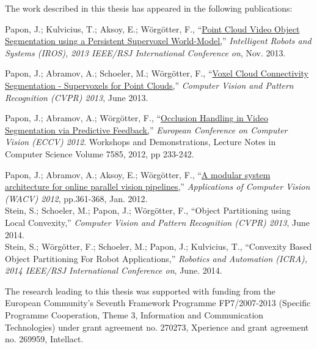 
\noindent


The work described in this thesis has appeared in the following publications: \\
\vspace{24pt} 

\hangindent=1.5cm Papon, J.;  Kulvicius, T.; Aksoy, E.; Wörgötter, F., ``\href{http://www.dpi.physik.uni-goettingen.de/cns/uploads_bibtexmodule/PDF/paponkulviciusaksoy2013.pdf}{Point Cloud Video Object Segmentation using a Persistent Supervoxel World-Model,}'' \emph{Intelligent Robots and Systems (IROS), 2013 IEEE/RSJ International Conference on}, Nov. 2013. \\
\vspace{12pt}

\hangindent=1.5cm Papon, J.;  Abramov, A.; Schoeler, M.; Wörgötter, F., ``\href{http://www.cv-foundation.org/openaccess/content_cvpr_2013/papers/Papon_Voxel_Cloud_Connectivity_2013_CVPR_paper.pdf}{Voxel Cloud Connectivity Segmentation - Supervoxels for Point Clouds,}'' \emph{Computer Vision and Pattern Recognition (CVPR) 2013}, June 2013. \\
\vspace{12pt}

\hangindent=1.5cm Papon, J.;  Abramov, A.; Wörgötter, F., ``\href{http://dx.doi.org/10.1007/978-3-642-33885-4_24}{Occlusion Handling in Video Segmentation via Predictive Feedback,}'' \emph{European Conference on Computer Vision (ECCV) 2012}. Workshops and Demonstrations, Lecture Notes in Computer Science Volume 7585, 2012, pp 233-242. \\
\vspace{12pt}

\hangindent=1.5cm Papon, J.;  Abramov, A.; Aksoy, E.; Wörgötter, F., ``\href{http://dx.doi.org/10.1109/WACV.2012.6163002}{A modular system architecture for online parallel vision pipelines,}'' \emph{Applications of Computer Vision (WACV) 2012}, pp.361-368, Jan. 2012. \\

\hangindent=1.5cm Stein, S.; Schoeler, M.; Papon, J.;  Wörgötter, F., ``{Object Partitioning using Local Convexity,}'' \emph{Computer Vision and Pattern Recognition (CVPR) 2013}, June 2014. \\

\hangindent=1.5cm Stein, S.;  Wörgötter, F.; Schoeler, M.; Papon, J.; Kulvicius, T., ``{Convexity Based Object Partitioning For Robot Applications,}'' \emph{Robotics and Automation (ICRA), 2014 IEEE/RSJ International Conference on}, June. 2014. \\

\vspace{100pt}

The research leading to this thesis was supported with funding from the European Community's Seventh Framework Programme FP7/2007-2013 (Specific Programme Cooperation, Theme 3, Information and Communication Technologies) under grant agreement no. 270273, Xperience and grant agreement no. 269959, Intellact.

 

